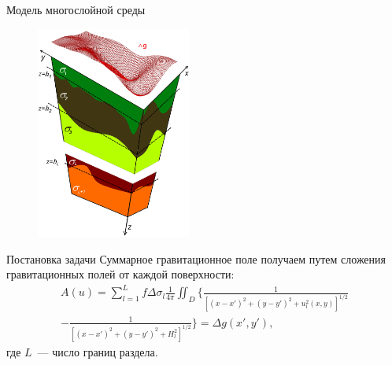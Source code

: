 \documentclass[10pt,pdf, mathserif, hyperref={unicode}]{beamer}
\begin{document}
\begin{frame}{Модель многослойной среды}
	\begin{figure}[h]
		\centering
		\includegraphics[height=7.0cm]{whitegrav.png}
		\label{fig:multlayer}
	\end{figure}
	\centering
\end{frame}
\begin{frame}{Постановка задачи}
	Суммарное гравитационное поле получаем путем сложения гравитационных полей от каждой поверхности:
	\begin{equation*}
	\begin{aligned}
	A(u)=\sum_{l=1}^{L}f\Delta\sigma_l\frac{1}{4\pi}\iint_D\bigg\{\frac{1}{[(x-x')^2+(y-y')^2+u_l^2(x,y)]^{1/2}} \\
	-\frac{1}{[(x-x')^2+(y-y')^2+H_l^2]^{1/2}}\bigg\}=\Delta g(x',y'),
	\end{aligned}
	\end{equation*}
	где $L$~--- число границ раздела.
\end{frame}
\end{document}
